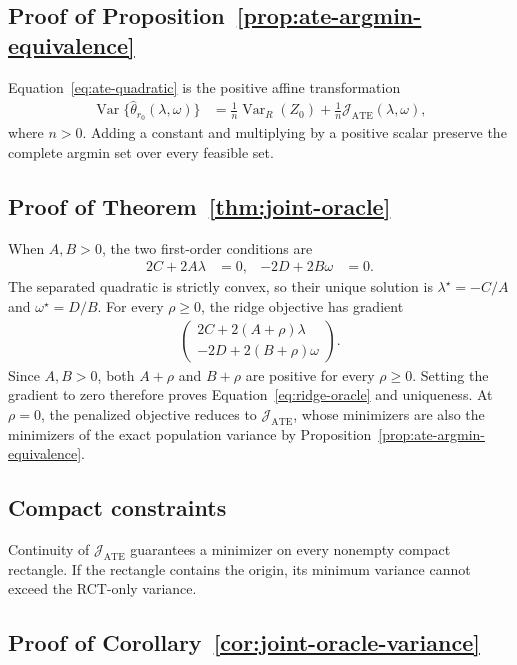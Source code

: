 \subsection{Proof of Proposition~\ref{prop:ate-argmin-equivalence}}

Equation~\eqref{eq:ate-quadratic} is the positive affine transformation
\begin{align*}
\operatorname{Var}\{\widehat\theta_{r_0}(\lambda,\omega)\}
&=\frac1n\operatorname{Var}_R(Z_0)
+\frac1n\mathcal J_{\mathrm{ATE}}(\lambda,\omega),
\end{align*}
where $n>0$. Adding a constant and multiplying by a positive scalar preserve
the complete argmin set over every feasible set.

\subsection{Proof of Theorem~\ref{thm:joint-oracle}}

When $A,B>0$, the two first-order conditions are
\begin{align*}
2C+2A\lambda&=0,
&
-2D+2B\omega&=0.
\end{align*}
The separated quadratic is strictly convex, so their unique solution is
$\lambda^\star=-C/A$ and $\omega^\star=D/B$.
For every $\rho\geq0$, the ridge objective has gradient
\begin{align*}
\begin{pmatrix}
2C+2(A+\rho)\lambda\\
-2D+2(B+\rho)\omega
\end{pmatrix}.
\end{align*}
Since $A,B>0$, both $A+\rho$ and $B+\rho$ are positive for every
$\rho\geq0$. Setting the gradient to zero therefore proves
Equation~\eqref{eq:ridge-oracle} and uniqueness. At $\rho=0$, the penalized
objective reduces to $\mathcal J_{\mathrm{ATE}}$, whose minimizers are also
the minimizers of the exact population variance by
Proposition~\ref{prop:ate-argmin-equivalence}.

\subsection{Compact constraints}

Continuity of $\mathcal J_{\mathrm{ATE}}$ guarantees a minimizer on every nonempty compact
rectangle. If the rectangle contains the origin, its minimum variance cannot
exceed the RCT-only variance.

\subsection{Proof of Corollary~\ref{cor:joint-oracle-variance}}

